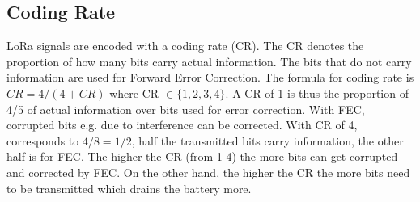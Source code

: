 \newpage

\subsection{Coding Rate}
LoRa signals are encoded with a coding rate (CR). The CR denotes the proportion of how many bits carry actual information. The bits that do not carry information are used 
for Forward Error Correction. The formula for coding rate is $CR=4/(4 + CR)$ where CR $\in \{1,2,3,4\}$. A CR of 1 is thus the proportion of 4/5 of actual information over 
bits used for error correction\cite{SX_design_guide,coding_rate_mobilefish}.
With FEC, corrupted bits e.g. due to interference can be corrected. With CR of 4, corresponds to $4/8 = 1/2$, half the transmitted bits carry information, the other half is for FEC.
The higher the CR (from 1-4) the more bits can get corrupted and corrected by FEC.
On the other hand, the higher the CR the more bits need to be transmitted which drains the battery more.


